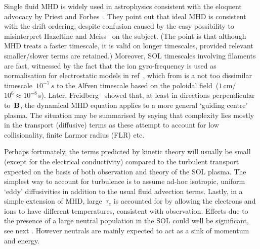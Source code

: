 Single fluid MHD is widely used in astrophysics consistent with the eloquent advocacy
by Priest and Forbes~\cite[\S\,1.7]{priestforbes}. They point out that ideal MHD
is consistent with the drift ordering, despite confusion caused by the easy possibility
to misinterpret
Hazeltine and Meiss~\cite {hazeltinemeiss} on the subject. (The point is that
although MHD treats a faster timescale, it is valid on longer timescales, provided
relevant smaller/slower terms are retained.)
Moreover, SOL timescales involving filaments are fast, witnessed by the fact that
the ion gyro-frequency is used as normalisation for electrostatic models in
ref~\cite{Mi12Simu}, which from  is a not too dissimilar timescale~$10^{-7}\,s$
to the Alfven timescale based on the poloidal field~($1$\,cm/$10^6 \approx 10^{-8}$\,s).
Later, Freidberg~\cite{freidberg}
showed that, at least in directions perpendicular to~${\bf B}$, the dynamical MHD equation
applies to a more general `guiding centre' plasma. The situation may be summarised
by saying that complexity lies mostly in the transport (diffusive) terms
as these attempt to account for low collisionality, finite Larmor radius (FLR) etc.

Perhaps fortunately, the terms predicted by kinetic theory will usually be small
(except for the electrical conductivity) compared to the turbulent transport
expected on the basis of both observation and theory of the SOL plasma. The
simplest way to account for turbulence is to assume ad-hoc isotropic, uniform `eddy'
diffusivities in addition to the usual fluid advection terms.
Lastly, in a simple extension of MHD, large~$\tau_e$  is accounted for by allowing
the electrons and ions to have different temperatures, consistent with observation.
Effects due to the presence of a large neutral population in the SOL
could well be significant, see next .
However neutrals are mainly expected to act as a sink of momentum and energy.

